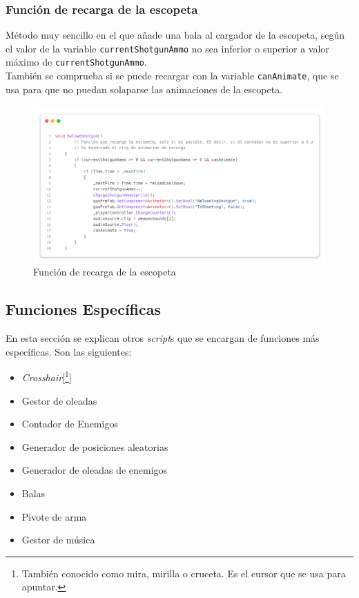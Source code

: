 \documentclass[11pt]{article}
\begin{document}
        \subsubsection{Función de recarga de la escopeta}  
            Método muy sencillo en el que añade una bala al cargador de la escopeta, según el valor de la variable \texttt{currentShotgunAmmo} no sea inferior o superior a valor máximo de \texttt{currentShotgunAmmo}.\\
            También se comprueba si se puede recargar con la variable \texttt{canAnimate}, que se usa para que no puedan solaparse las animaciones de la escopeta. 
            \begin{figure}[H]
                \centering
                \includegraphics[width=\textwidth]{Images/ShootyMacShooty/reload.png}
                \caption{Función de recarga de la escopeta}
            \end{figure}
    \newpage
    \subsection{Funciones Específicas}
        En esta sección se explican otros \textit{script}s que se encargan de funciones más específicas. Son las siguientes:\\
        \begin{itemize}
            \item \textit{Crosshair}[\footnote{También conocido como mira, mirilla o cruceta. Es el cursor que se usa para apuntar.}]
            \item Gestor de oleadas
            \item Contador de Enemigos
            \item Generador de posiciones aleatorias
            \item Generador de oleadas de enemigos
            \item Balas
            \item Pivote de arma
            \item Gestor de música
        \end{itemize}
\end{document}
